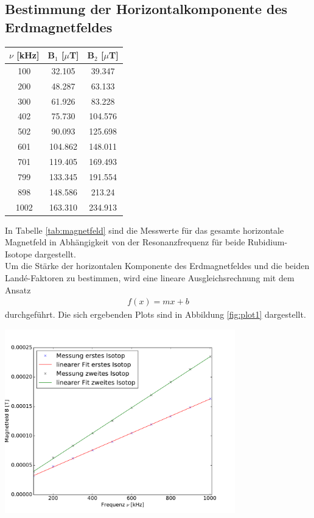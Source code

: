 \documentclass[]{scrartcl}
\begin{document}
\subsection{Bestimmung der Horizontalkomponente des Erdmagnetfeldes}

\begin{center}
	\begin{tabular}{|c|c|c|}
	\hline $\nu$ [kHz] & B$_1$ [$\mu$T] & B$_2$ [$\mu$T] \\
	\hline	100	&	32.105	&	39.347	\\
	\hline	200	&	48.287	&	63.133	\\
	\hline	300	&	61.926	&	83.228	\\
	\hline	402	&	75.730	&	104.576	\\
	\hline	502	&	90.093	&	125.698	\\
	\hline	601	&	104.862	&	148.011	\\
	\hline	701	&	119.405	&	169.493	\\
	\hline	799	&	133.345	&	191.554	\\
	\hline	898	&	148.586	&	213.24	\\
	\hline	1002	&	163.310	&	234.913	\\
	\hline 
	\end{tabular}
\label{tab:magnetfeld}
\end{center}
In Tabelle \ref{tab:magnetfeld} sind die Messwerte für das gesamte horizontale Magnetfeld in Abhängigkeit von der Resonanzfrequenz für beide Rubidium-Isotope dargestellt. \\
Um die Stärke der horizontalen Komponente des Erdmagnetfeldes und die beiden Landé-Faktoren zu bestimmen, wird eine lineare Ausgleichsrechnung mit dem Ansatz
\begin{align}
f(x)=mx+b
\end{align}
durchgeführt. Die sich ergebenden Plots sind in Abbildung \ref{fig:plot1} dargestellt.
\begin{center}
	\includegraphics[width=10cm]{images/plot1.pdf}
	\label{fig:plot1}
\end{center}
\end{document}
